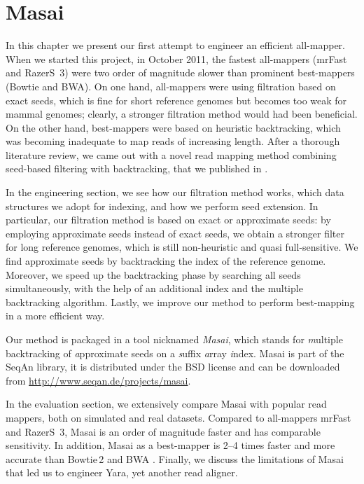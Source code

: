 
\chapter{Masai}

In this chapter we present our first attempt to engineer an efficient all-mapper.
When we started this project, in October 2011, the fastest all-mappers (mrFast and RazerS~3) were two order of magnitude slower than prominent best-mappers (Bowtie and BWA).
On one hand, all-mappers were using filtration based on exact seeds, which is fine for short reference genomes but becomes too weak for mammal genomes; clearly, a stronger filtration method would had been beneficial.
On the other hand, best-mappers were based on heuristic backtracking, which was becoming inadequate to map reads of increasing length.
After a thorough literature review, we came out with a novel read mapping method combining seed-based filtering with backtracking, that we published in \citep{Siragusa2013}.

In the engineering section, we see how our filtration method works, which data structures we adopt for indexing, and how we perform seed extension.
In particular, our filtration method is based on exact or approximate seeds: by employing approximate seeds instead of exact seeds, we obtain a stronger filter for long reference genomes, which is still non-heuristic and quasi full-sensitive.
We find approximate seeds by backtracking the index of the reference genome.
Moreover, we speed up the backtracking phase by searching all seeds simultaneously, with the help of an additional index and the multiple backtracking algorithm.
Lastly, we improve our method to perform best-mapping in a more efficient way.

Our method is packaged in a \CC tool nicknamed \emph{Masai}, which stands for \emph{m}ultiple backtracking of \emph{a}pproximate seeds on a \emph{s}uffix \emph{a}rray \emph{i}ndex.
Masai is part of the SeqAn library, it is distributed under the BSD license and can be downloaded from \url{http://www.seqan.de/projects/masai}.

In the evaluation section, we extensively compare Masai with popular read mappers, both on simulated and real datasets.
Compared to all-mappers mrFast and RazerS~3, Masai is an order of magnitude faster and has comparable sensitivity.
In addition, Masai as a best-mapper is 2--4 times faster and more accurate than Bowtie\,2 \citep{Bowtie2} and BWA \citep{BWA}.
Finally, we discuss the limitations of Masai that led us to engineer Yara, yet another read aligner.

